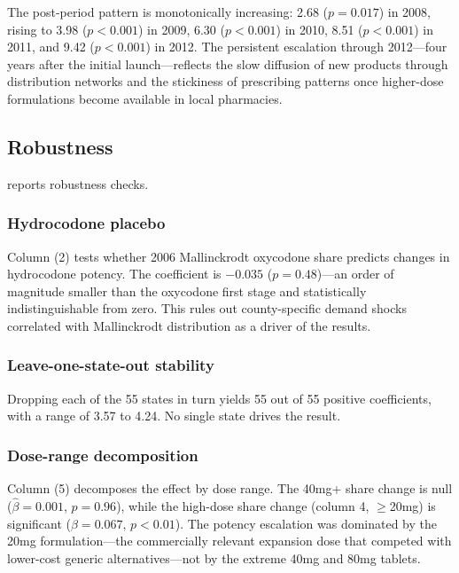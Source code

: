 \documentclass[12pt]{article}
\begin{document}
The post-period pattern is monotonically increasing: 2.68 ($p = 0.017$) in 2008, rising to 3.98 ($p < 0.001$) in 2009, 6.30 ($p < 0.001$) in 2010, 8.51 ($p < 0.001$) in 2011, and 9.42 ($p < 0.001$) in 2012. The persistent escalation through 2012---four years after the initial launch---reflects the slow diffusion of new products through distribution networks and the stickiness of prescribing patterns once higher-dose formulations become available in local pharmacies.

\subsection{Robustness}

 reports robustness checks.



\subsubsection*{Hydrocodone placebo} Column (2) tests whether 2006 Mallinckrodt oxycodone share predicts changes in hydrocodone potency. The coefficient is $-0.035$ ($p = 0.48$)---an order of magnitude smaller than the oxycodone first stage and statistically indistinguishable from zero. This rules out county-specific demand shocks correlated with Mallinckrodt distribution as a driver of the results.

\subsubsection*{Leave-one-state-out stability} Dropping each of the 55 states in turn yields 55 out of 55 positive coefficients, with a range of 3.57 to 4.24. No single state drives the result.

\subsubsection*{Dose-range decomposition} Column (5) decomposes the effect by dose range. The 40mg+ share change is null ($\hat{\beta} = 0.001$, $p = 0.96$), while the high-dose share change (column 4, $\geq$20mg) is significant ($\hat{\beta} = 0.067$, $p < 0.01$). The potency escalation was dominated by the 20mg formulation---the commercially relevant expansion dose that competed with lower-cost generic alternatives---not by the extreme 40mg and 80mg tablets.
\end{document}
